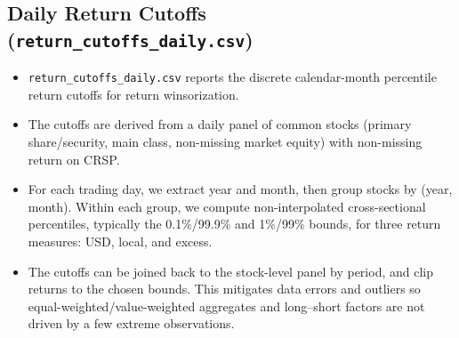 \documentclass[12pt,title,fleqn]{article}
\begin{document}
\subsection{Daily Return Cutoffs (\texttt{return\_cutoffs\_daily.csv})}
\begin{itemize}
    \item \texttt{return\_cutoffs\_daily.csv} reports the discrete calendar-month percentile return cutoffs for return winsorization.
    \item The cutoffs are derived from a daily panel of common stocks (primary share/security, main class, non-missing market equity) with non-missing return on CRSP.
    \item For each trading day, we extract year and month, then group stocks by (year, month). Within each group, we compute non-interpolated cross-sectional percentiles, typically the 0.1\%/99.9\% and 1\%/99\% bounds, for three return measures: USD, local, and excess.
    \item The cutoffs can be joined back to the stock-level panel by period, and clip returns to the chosen bounds. This mitigates data errors and outliers so equal-weighted/value-weighted aggregates and long–short factors are not driven by a few extreme observations.
\end{itemize}
\end{document}
